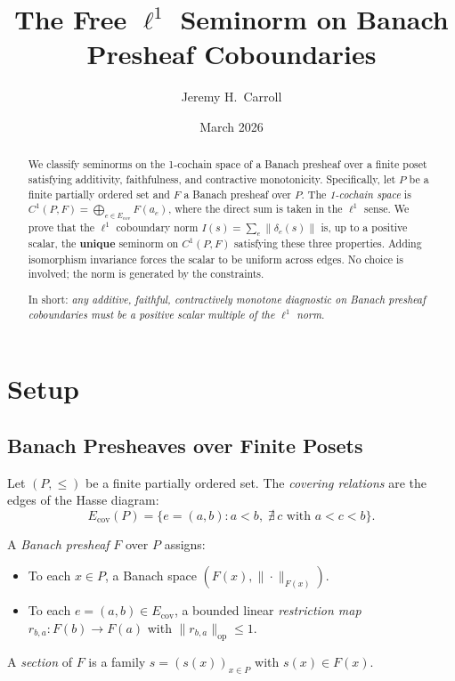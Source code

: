 \documentclass[11pt,a4paper]{amsart}
\title{The Free $\ell^1$ Seminorm on Banach Presheaf Coboundaries}
\author{Jeremy H.\ Carroll}
\date{March 2026}
\theoremstyle{plain}
\theoremstyle{definition}
\DeclareMathOperator{\opnorm}{op}
\begin{document}
\begin{abstract}
We classify seminorms on the 1-cochain space of a Banach presheaf over a finite poset satisfying additivity, faithfulness, and contractive monotonicity. Specifically, let $P$ be a finite partially ordered set and $F$ a Banach presheaf over $P$. The \emph{1-cochain space} is $C^1(P, F) = \bigoplus_{e \in E_{\mathrm{cov}}} F(a_e)$, where the direct sum is taken in the $\ell^1$ sense. We prove that the $\ell^1$ coboundary norm $I(s) = \sum_e \|\delta_e(s)\|$ is, up to a positive scalar, the \textbf{unique} seminorm on $C^1(P, F)$ satisfying these three properties. Adding isomorphism invariance forces the scalar to be uniform across edges. No choice is involved; the norm is generated by the constraints.

\medskip\noindent
In short: \emph{any additive, faithful, contractively monotone diagnostic on Banach presheaf coboundaries must be a positive scalar multiple of the $\ell^1$ norm.}
\end{abstract}

\maketitle

\section{Setup}

\subsection{Banach Presheaves over Finite Posets}

Let $(P, \leq)$ be a finite partially ordered set. The \emph{covering relations} are the edges of the Hasse diagram:
\[
E_{\mathrm{cov}}(P) = \{e = (a, b) : a < b,\; \nexists\, c \text{ with } a < c < b\}.
\]

A \emph{Banach presheaf} $F$ over $P$ assigns:
\begin{itemize}[nosep]
  \item To each $x \in P$, a Banach space $(F(x), \|\cdot\|_{F(x)})$.
  \item To each $e = (a, b) \in E_{\mathrm{cov}}$, a bounded linear \emph{restriction map} $r_{b,a}: F(b) \to F(a)$ with $\|r_{b,a}\|_{\opnorm} \leq 1$.
\end{itemize}

A \emph{section} of $F$ is a family $s = (s(x))_{x \in P}$ with $s(x) \in F(x)$.
\end{document}
